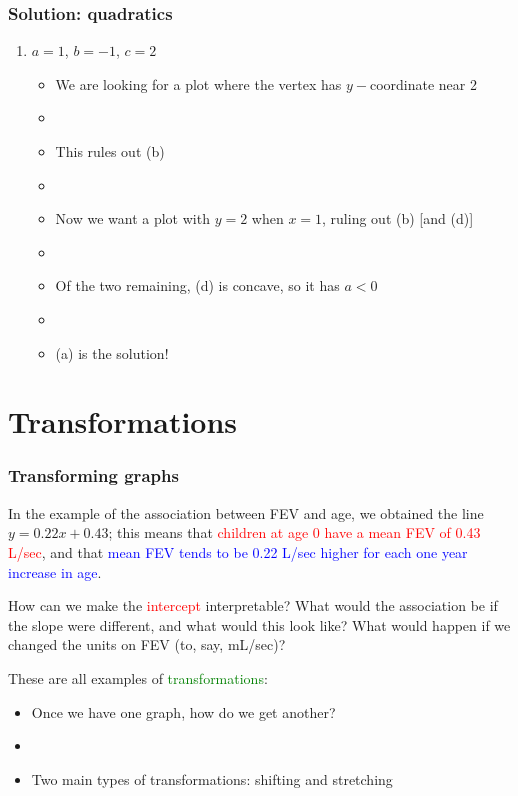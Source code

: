 \documentclass[11pt, hyperref={colorlinks, urlcolor=blue}]{beamer}
\newcommand{\myframe}[1]{\begin{frame} \frametitle{#1}}
\begin{document}
\myframe{Solution: quadratics}
\begin{enumerate}
\item $a = 1$, $b = -1$, $c = 2$
\begin{itemize}
\item We are looking for a plot where the vertex has $y-$coordinate near 2
\item[]
\item This rules out (b)
\item[]
\item Now we want a plot with $y = 2$ when $x = 1$, ruling out (b) [and (d)]
\item[]
\item Of the two remaining, (d) is concave, so it has $a < 0$
\item[]
\item (a) is the solution!
\end{itemize}
\end{enumerate}
\end{frame}

\section{Transformations}
\myframe{Transforming graphs}
In the example of the association between FEV and age, we obtained the line $y = 0.22x + 0.43$; this means that \textcolor{red}{children at age 0 have a mean FEV of 0.43 L/sec}, and that \textcolor{blue}{mean FEV tends to be 0.22 L/sec higher for each one year increase in age}.

How can we make the \textcolor{red}{intercept} interpretable? What would the association be if the slope were different, and what would this look like? What would happen if we changed the units on FEV (to, say, mL/sec)? 

These are all examples of \textcolor{green}{transformations}:
\begin{itemize}
\item Once we have one graph, how do we get another?
\item[]
\item Two main types of transformations: shifting and stretching
\end{itemize}
\end{frame}
\end{document}
